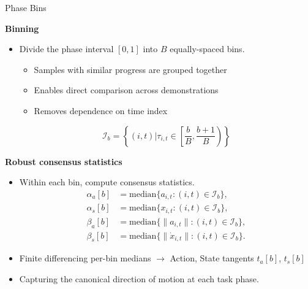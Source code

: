 \documentclass{beamer}
\begin{document}
\begin{frame}{Phase Bins}

    \textbf{Binning}
    \begin{itemize}
        \item Divide the phase interval $[0, 1]$ into $B$ equally-spaced bins.
            \begin{itemize}
                \item Samples with similar progress are grouped together
                \item Enables direct comparison across demonstrations
                \item Removes dependence on time index
            \end{itemize}
            \vspace{-0.5em}
            \[
                \mathcal{I}_b = \left\{(i, t) \Big| \tau_{i, t} \in \left[{\frac{b}{B}}, {\frac{b+1}{B}}\right) \right\}
            \]
    \end{itemize}

    \textbf{Robust consensus statistics}
    \begin{itemize}
        \item \small Within each bin, compute consensus statistics.
            \vspace{-0.75em}
            \begin{align}
                \alpha_a[b] & = \mathrm{median}\{a_{i,t} : (i,t)\in\mathcal{I}_b\}, \\
                \alpha_s[b] & = \mathrm{median}\{x_{i,t} : (i,t)\in\mathcal{I}_b\}, \\
                \beta_a[b]  & = \mathrm{median}\{\|a_{i,t}\| : (i,t)\in\mathcal{I}_b\}, \\
                \beta_s[b]  & = \mathrm{median}\{\|\dot{x}_{i,t}\| : (i,t)\in\mathcal{I}_b\}.
            \end{align}
            \vspace{-1.5em}
        \item \small Finite differencing per-bin medians $\rightarrow$ Action, State tangents $t_a[b]$, $t_s[b]$
        \item \small Capturing the canonical direction of motion at each task phase.
    \end{itemize}

\end{frame}
\end{document}
